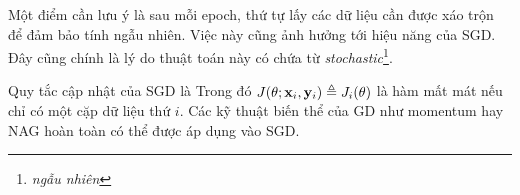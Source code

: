 Một điểm cần lưu ý là sau mỗi epoch, thứ tự lấy các dữ liệu cần được xáo trộn để đảm bảo tính ngẫu nhiên.
Việc này cũng ảnh hưởng tới hiệu năng của SGD. Đây cũng chính là lý do thuật
toán này có chứa từ \textit{stochastic}\footnote{\textit{ngẫu nhiên}}.

Quy tắc cập nhật của SGD là
Trong đó $J(\theta; \mathbf{x}_i, \mathbf{y}_i) \triangleq J_i(\theta)$ là hàm
mất mát nếu chỉ có một cặp dữ liệu thứ $i$. Các kỹ thuật biến
thể của GD như momentum hay NAG hoàn toàn có thể được áp dụng vào SGD.










